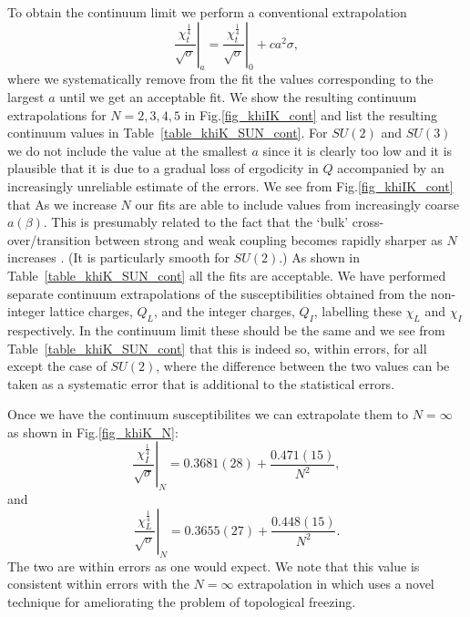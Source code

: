 \documentclass[12pt]{article}
\newcommand{\be}{\begin{equation}}
\newcommand{\ee}{\end{equation}}
\begin{document}
To obtain the continuum limit we perform a conventional extrapolation
%
\be
\left.\frac{\chi_t^{\frac{1}{4}}}{\surd\sigma}\right|_a
=
\left.\frac{\chi_t^{\frac{1}{4}}}{\surd\sigma}\right|_0
+ c a^2\sigma,
\label{eqn_chi_cont}
\ee
%
where we systematically remove from the fit the values corresponding to the largest $a$ until we
get an acceptable fit. We show the resulting continuum extrapolations for $N=2,3,4,5$ in
Fig.\ref{fig_khiIK_cont} and list the resulting continuum values in Table~\ref{table_khiK_SUN_cont}.
For $SU(2)$ and $SU(3)$ we do not include the value at the smallest $a$ since it is clearly too low
and it is plausible that it is due to a gradual loss of ergodicity in $Q$ accompanied by an
increasingly unreliable estimate of the errors. We see from Fig.\ref{fig_khiIK_cont} that
As we increase $N$ our fits are able to include values from increasingly coarse $a(\beta)$.
This is presumably related to the fact that the `bulk' cross-over/transition between
strong and weak coupling becomes rapidly sharper as $N$ increases
%
\cite{BLMTUW05}.
%
(It is particularly smooth for $SU(2)$.)
As shown in Table~\ref{table_khiK_SUN_cont} all the fits are acceptable.
We have performed separate continuum extrapolations of the susceptibilities obtained from
the non-integer lattice charges, $Q_L$, and the integer charges, $Q_I$, labelling these
$\chi_L$ and $\chi_I$ respectively. In the continuum limit these should be the same and we see
from Table~\ref{table_khiK_SUN_cont} that this is indeed so, within errors, for all except
the case of $SU(2)$, where the difference between the two values can be taken as a
systematic error that is additional to the statistical errors. 

Once we have the continuum susceptibilites we can extrapolate them to $N=\infty$  as shown
in Fig.\ref{fig_khiK_N}:
%
\be
\left.\frac{\chi_I^{\frac{1}{4}}}{\surd\sigma}\right|_N
=
0.3681(28) + \frac{0.471(15)}{N^2},
\label{eqn_chiIN}
\ee
%
and 
%
\be
\left.\frac{\chi_L^{\frac{1}{4}}}{\surd\sigma}\right|_N
=
0.3655(27) + \frac{0.448(15)}{N^2}.
\label{eqn_chiN}
\ee
%
The two are within errors as one would expect. We note that this value is consistent within errors
with the $N=\infty$ extrapolation in
%
\cite{bonanno_Q}
%
which uses a novel technique
%
\cite{hasenbusch_Q}
%
for ameliorating the problem of topological freezing.
\end{document}
